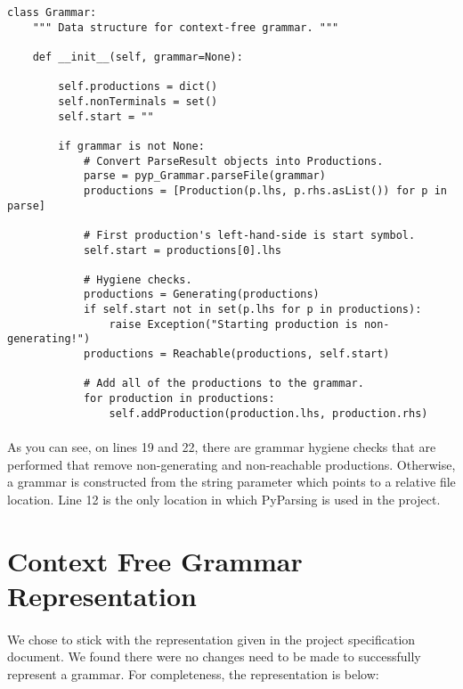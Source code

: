 \documentclass{article}
\begin{document}
\begin{verbatim}
class Grammar:
    """ Data structure for context-free grammar. """

    def __init__(self, grammar=None):

        self.productions = dict()
        self.nonTerminals = set()
        self.start = ""

        if grammar is not None:
            # Convert ParseResult objects into Productions.
            parse = pyp_Grammar.parseFile(grammar)
            productions = [Production(p.lhs, p.rhs.asList()) for p in parse]

            # First production's left-hand-side is start symbol.
            self.start = productions[0].lhs

            # Hygiene checks.
            productions = Generating(productions)
            if self.start not in set(p.lhs for p in productions):
                raise Exception("Starting production is non-generating!")
            productions = Reachable(productions, self.start)

            # Add all of the productions to the grammar.
            for production in productions:
                self.addProduction(production.lhs, production.rhs)
\end{verbatim}
\label{exerpt:grammar}

\paragraph{} As you can see, on lines 19 and 22, there are grammar 
hygiene checks that are performed that remove non-generating and
non-reachable productions. Otherwise, a grammar is constructed from
the string parameter which points to a relative file location. Line 12
is the only location in which PyParsing is used in the project.

\section{Context Free Grammar Representation}
\label{sec:cfg_rep}
\paragraph{} We chose to stick with the representation given in the
project specification document. We found there were no changes need
to be made to successfully represent a grammar. For completeness, the
representation is below:
\end{document}
